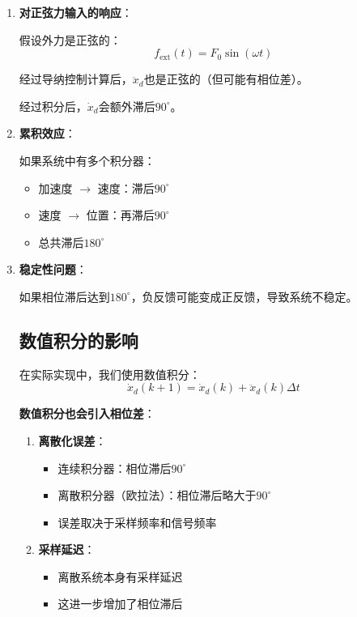 \documentclass[12pt,a4paper]{article}
\begin{document}
\begin{enumerate}
\item \textbf{对正弦力输入的响应}：

假设外力是正弦的：
\begin{equation}
f_{\text{ext}}(t) = F_0 \sin(\omega t)
\end{equation}

经过导纳控制计算后，$\ddot{x}_d$也是正弦的（但可能有相位差）。

经过积分后，$\dot{x}_d$会额外滞后$90^\circ$。

\item \textbf{累积效应}：

如果系统中有多个积分器：
\begin{itemize}
\item 加速度 $\to$ 速度：滞后$90^\circ$
\item 速度 $\to$ 位置：再滞后$90^\circ$
\item 总共滞后$180^\circ$
\end{itemize}

\item \textbf{稳定性问题}：

如果相位滞后达到$180^\circ$，负反馈可能变成正反馈，导致系统不稳定。

\subsection{数值积分的影响}

在实际实现中，我们使用数值积分：
\begin{equation}
\dot{x}_d(k+1) = \dot{x}_d(k) + \ddot{x}_d(k) \Delta t
\end{equation}

\textbf{数值积分也会引入相位差}：

\begin{enumerate}
\item \textbf{离散化误差}：
\begin{itemize}
\item 连续积分器：相位滞后$90^\circ$
\item 离散积分器（欧拉法）：相位滞后略大于$90^\circ$
\item 误差取决于采样频率和信号频率
\end{itemize}

\item \textbf{采样延迟}：
\begin{itemize}
\item 离散系统本身有采样延迟
\item 这进一步增加了相位滞后
\end{itemize}
\end{enumerate}


\end{enumerate}
\end{document}
